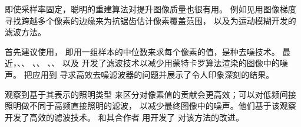 即使采样率固定，聪明的重建算法对提升图像质量也很有用。
例如见\citet{10.1145/1572769.1572787}用图像梯度
寻找跨越多个像素的边缘来为抗锯齿估计像素覆盖范围，
以及\citet{Guertin2014MotionBlur}为运动模糊开发的滤波方法。

\citet{55149}首先建议使用，
即用一组样本的中位数来求每个像素的值，是种去噪技术。
最近，\citet{10.1145/2010324.1964950}、\citet{10.1145/2185520.2185547}、
\citet{10.1111/cgf.12029}、\citet{10.1145/2366145.2366214}、
\citet{10.1111/cgf.12219}、\citet{10.1145/2532708}、
\citet{10.1111/cgf.12415}以及\citet{10.1111/cgf.12587}
开发了滤波技术以减少用蒙特卡罗算法渲染的图像中的噪声。
\citet{10.1145/2766977}把应用到
寻求高效去噪滤波器的问题并展示了令人印象深刻的结果。

\citet{jensen1995optimizing}观察到基于其表示的照明类型
来区分对像素值的贡献会更高效；可以对低频间接照明做不同于高频直接照明的滤波，
以减少最终图像中的噪声。他们基于该观察开发了高效的滤波技术。
\citeauthor{keller1998quasi}和其合作者
用开发了
对该方法的改进\citep{keller1998quasi,10.2312:EGWR:EGWR02:015-024}。